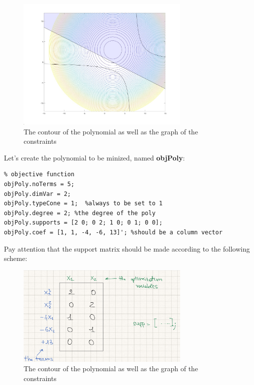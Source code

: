 \begin{figure}[htbp]  %
    \centering
    \includegraphics[width=0.75\textwidth]{images/lab02_contour.jpg}
    \caption{The contour of the polynomial as well as the graph of the constraints}
    \label{fig:constraints}
\end{figure}

Let's create the polynomial to be minized, named \textbf{objPoly}:

\begin{example}
\begin{lstlisting}
% objective function
objPoly.noTerms = 5;
objPoly.dimVar = 2;
objPoly.typeCone = 1;  %always to be set to 1
objPoly.degree = 2; %the degree of the poly
objPoly.supports = [2 0; 0 2; 1 0; 0 1; 0 0];
objPoly.coef = [1, 1, -4, -6, 13]'; %should be a column vector
\end{lstlisting}
\end{example}
Pay attention that the support matrix should be made according to the following scheme:

\begin{figure}[ht]  %
    \centering
    \includegraphics[width=0.75\textwidth]{images/support-matrix.png}
    \caption{The contour of the polynomial as well as the graph of the constraints}
    \label{fig:constraints}
\end{figure}


